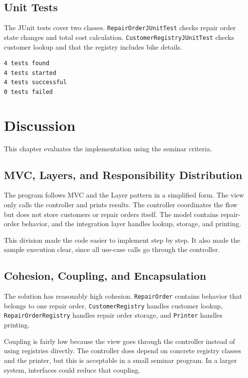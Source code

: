 \documentclass[12pt]{article}
\begin{document}
\subsection{Unit Tests}

The JUnit tests cover two classes. \texttt{RepairOrderJUnitTest} checks repair order state changes and total cost calculation. \texttt{CustomerRegistryJUnitTest} checks customer lookup and that the registry includes bike details.

\begin{lstlisting}
4 tests found
4 tests started
4 tests successful
0 tests failed
\end{lstlisting}

\section{Discussion}

This chapter evaluates the implementation using the seminar criteria.

\subsection{MVC, Layers, and Responsibility Distribution}

The program follows MVC and the Layer pattern in a simplified form. The view only calls the controller and prints results. The controller coordinates the flow but does not store customers or repair orders itself. The model contains repair-order behavior, and the integration layer handles lookup, storage, and printing.

This division made the code easier to implement step by step. It also made the sample execution clear, since all use-case calls go through the controller.

\subsection{Cohesion, Coupling, and Encapsulation}

The solution has reasonably high cohesion. \texttt{RepairOrder} contains behavior that belongs to one repair order, \texttt{CustomerRegistry} handles customer lookup, \texttt{RepairOrderRegistry} handles repair order storage, and \texttt{Printer} handles printing.

Coupling is fairly low because the view goes through the controller instead of using registries directly. The controller does depend on concrete registry classes and the printer, but this is acceptable in a small seminar program. In a larger system, interfaces could reduce that coupling.
\end{document}

